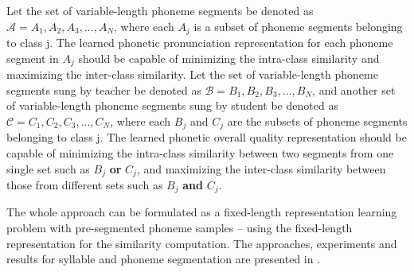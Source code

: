 Let the set of variable-length phoneme segments be denoted as $\mathcal{A} = {A_1, A_2, A_3, ..., A_N}$, where each $A_j$ is a subset of phoneme segments belonging to class j. The learned phonetic pronunciation representation for each phoneme segment in $A_j$ should be capable of minimizing the intra-class similarity and maximizing the inter-class similarity. Let the set of variable-length phoneme segments sung by teacher be denoted as $\mathcal{B}={B_1, B_2, B_3, ..., B_{N}}$, and another set of variable-length phoneme segments sung by student be denoted as $\mathcal{C}={C_1, C_2, C_3, ..., C_{N}}$, where each $B_j$ and $C_j$ are the subsets of phoneme segments belonging to class j. The learned phonetic overall quality representation should be capable of minimizing the intra-class similarity between two segments from one single set such as $B_j$ \textbf{or} $C_j$, and maximizing the inter-class similarity between those from different sets such as $B_j$ \textbf{and} $C_j$. 

The whole approach can be formulated as a fixed-length representation learning problem with pre-segmented phoneme samples -- using the fixed-length representation for the similarity computation. The approaches, experiments and results for syllable and phoneme segmentation are presented in .